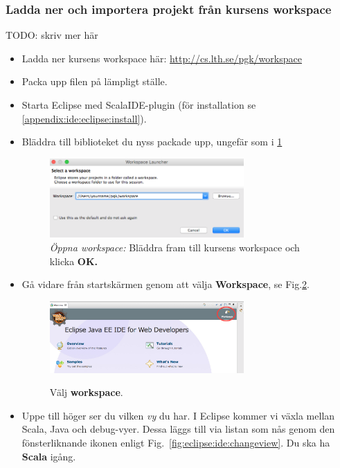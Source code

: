 \subsubsection{Ladda ner och importera projekt från kursens workspace}

TODO: skriv mer här

\begin{itemize}
\item Ladda ner kursens workspace här: \url{http://cs.lth.se/pgk/workspace}
\item Packa upp filen på lämpligt ställe.
\item Starta Eclipse med ScalaIDE-plugin (för installation se \ref{appendix:ide:eclipse:install}).
\item Bläddra till biblioteket du nyss packade upp, ungefär som i \ref{fig:eclipse:ide:open}
\begin{figure}[H]
\centering
\includegraphics[width=0.7\textwidth]{../img/pirates/selectws.png}
\caption { \emph{Öppna workspace:} Bläddra fram till kursens workspace och klicka {\bf OK. }}
\label{fig:eclipse:ide:open}
\end{figure}

\item Gå vidare från startskärmen genom att välja {\bf Workspace}, se Fig.\ref{fig:eclipse:ide:selectws}.
\begin{figure}[H]
\centering
\includegraphics[width=0.7\textwidth]{../img/pirates/selectws2.png} \\

\caption {Välj {\bf workspace}.}
\label{fig:eclipse:ide:selectws}
\end{figure}

\item Uppe till höger ser du vilken \emph{vy} du har. I Eclipse kommer vi växla mellan Scala, Java och debug-vyer. Dessa läggs till via listan som nås genom den fönsterliknande ikonen enligt Fig.~\ref{fig:eclipse:ide:changeview}. Du ska ha {\bf Scala} igång.


\end{itemize}
